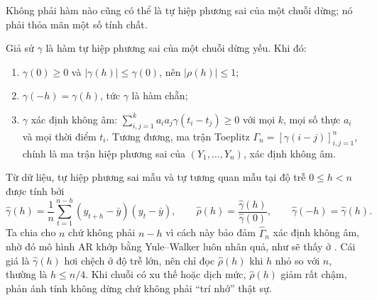 
Không phải hàm nào cũng có thể là tự hiệp phương sai của một chuỗi dừng; nó phải thỏa mãn một số tính chất.
\begin{kq}
Giả sử $\gamma$ là hàm tự hiệp phương sai của một chuỗi dừng yếu. Khi đó:
\begin{enumerate}[label=(\roman*),leftmargin=*,itemsep=1pt]
\item $\gamma(0)\ge0$ và $|\gamma(h)|\le\gamma(0)$, nên $|\rho(h)|\le1$;
\item $\gamma(-h)=\gamma(h)$, tức $\gamma$ là hàm chẵn;
\item $\gamma$ xác định không âm: $\sum_{i,j=1}^{k}a_ia_j\gamma(t_i-t_j)\ge0$ với mọi $k$, mọi số thực $a_i$ và mọi thời điểm $t_i$. Tương đương, ma trận Toeplitz $\Gamma_n=[\gamma(i-j)]_{i,j=1}^{n}$, chính là ma trận hiệp phương sai của $(Y_1,\dots,Y_n)$, xác định không âm.
\end{enumerate}
\end{kq}
Từ dữ liệu, tự hiệp phương sai mẫu và tự tương quan mẫu tại độ trễ $0\le h<n$ được tính bởi
\[
\hat\gamma(h)=\frac1n\sum_{t=1}^{n-h}(y_{t+h}-\bar y)(y_t-\bar y),\qquad \hat\rho(h)=\frac{\hat\gamma(h)}{\hat\gamma(0)},\qquad \hat\gamma(-h)=\hat\gamma(h).
\]
Ta chia cho $n$ chứ không phải $n-h$ vì cách này bảo đảm $\hat\Gamma_n$ xác định không âm, nhờ đó mô hình AR khớp bằng Yule--Walker luôn nhân quả, như sẽ thấy ở . Cái giá là $\hat\gamma(h)$ hơi chệch ở độ trễ lớn, nên chỉ đọc $\hat\rho(h)$ khi $h$ nhỏ so với $n$, thường là $h\le n/4$. Khi chuỗi có xu thế hoặc dịch mức, $\hat\rho(h)$ giảm rất chậm, phản ánh tính không dừng chứ không phải ``trí nhớ'' thật sự.


